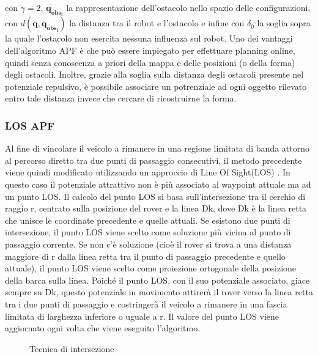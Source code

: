 con $ \gamma = 2$, $ \boldsymbol{q_{obs_i}} $ la rappresentazione dell'ostacolo nello spazio delle configurazioni, con $ d( \boldsymbol{q},  \boldsymbol{q_{obs_i}}) $ la
distanza tra il robot e l'ostacolo e infine con $ \delta_0 $ la soglia sopra la quale l'ostacolo non esercita nessuna influenza sul robot.
Uno dei vantaggi dell'algoritmo APF è che può essere impiegato per effettuare planning online, quindi senza conoscenza a priori della mappa e delle posizioni (o della 
forma) degli ostacoli. Inoltre, grazie alla soglia sulla distanza degli ostacoli presente nel potenziale repulsivo, è possibile associare un potrenziale ad ogni oggetto rilevato entro tale distanza invece che cercare di ricostruirne la forma.

\subsubsection{LOS APF}
 Al fine di vincolare il veicolo a rimanere in una regione limitata di banda attorno al percorso diretto tra due punti di passaggio consecutivi, il metodo precedente viene quindi modificato utilizzando un approccio di Line Of Sight(LOS) \cite{LOSAPF}. In questo caso il potenziale attrattivo non è più associato al waypoint attuale ma ad un punto LOS.
Il calcolo del punto LOS si basa sull'intersezione tra il cerchio di raggio r, centrato sulla posizione del rover e la linea Dk, dove Dk è la linea retta che unisce le coordinate precedente e quelle attuali. Se esistono due punti di intersezione, il punto LOS viene scelto come soluzione più vicina al punto di passaggio corrente. Se non c'è soluzione (cioè il rover si trova a una distanza maggiore di r dalla linea retta tra il punto di passaggio precedente e quello attuale), il punto LOS viene scelto come proiezione ortogonale della posizione della barca sulla linea.
Poiché il punto LOS, con il suo potenziale associato, giace sempre su Dk, questo potenziale in movimento attirerà il rover verso la linea retta tra i due punti di passaggio e costringerà il veicolo a rimanere in una fascia limitata di larghezza inferiore o uguale a r. 
Il valore del punto LOS viene aggiornato ogni volta che viene eseguito l'algoritmo.
\begin{figure} [H]
    \centering
    
    \caption{Tecnica di intersezione}
    \label{fig:LOS}
\end{figure}

